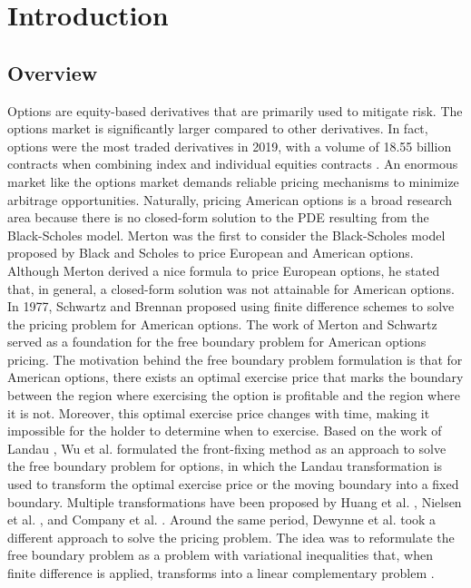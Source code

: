 \section{Introduction}

\subsection{Overview}

Options are equity-based derivatives that are primarily used to mitigate risk. The options market is significantly larger compared to other derivatives. In fact, options were the most traded derivatives in 2019, with a volume of 18.55 billion contracts when combining index and individual equities contracts \cite{statista_2019}. An enormous market like the options market demands reliable pricing mechanisms to minimize arbitrage opportunities. Naturally, pricing American options is a broad research area because there is no closed-form solution to the PDE resulting from the Black-Scholes model. Merton \cite{merton_1973} was the first to consider the Black-Scholes model proposed by Black and Scholes \cite{black_scholes_1973} to price European and American options. Although Merton derived a nice formula to price European options, he stated that, in general, a closed-form solution was not attainable for American options. In 1977, Schwartz \cite{schwartz_197779} and Brennan \cite{brennan_1997} proposed using finite difference schemes to solve the pricing problem for American options. The work of Merton and Schwartz served as a foundation for the free boundary problem for American options pricing. The motivation behind the free boundary problem formulation is that for American options, there exists an optimal exercise price that marks the boundary between the region where exercising the option is profitable and the region where it is not. Moreover, this optimal exercise price changes with time, making it impossible for the holder to determine when to exercise. Based on the work of Landau \cite{landau_1950_heat_ci}, Wu et al. \cite{wu1997front} formulated the front-fixing method as an approach to solve the free boundary problem for options, in which the Landau transformation is used to transform the optimal exercise price or the moving boundary into a fixed boundary. Multiple transformations have been proposed by Huang et al. \cite{huang_2000}, Nielsen et al. \cite{nielsen_2001}, and Company et al. \cite{company_egorova_jodar_2014}. Around the same period, Dewynne et al. \cite{dewynne_howison_rupf_wilmott_1993} took a different approach to solve the pricing problem. The idea was to reformulate the free boundary problem as a problem with variational inequalities that, when finite difference is applied, transforms into a linear complementary problem \cite{dantzig_1968}.

